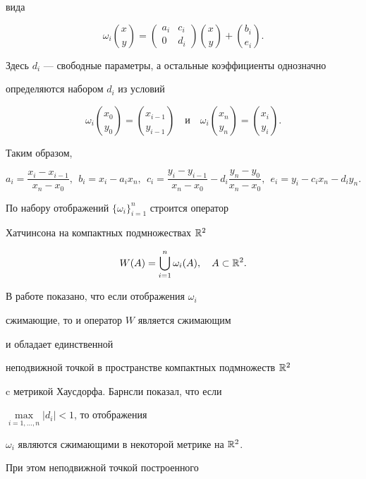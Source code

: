 вида


$$


\omega_i\binom{x}{y} = \begin{pmatrix} a_i & c_i \\ 0 & d_i \end{pmatrix}


\binom{x}{y} + \binom{b_i}{e_i}.


$$


Здесь $d_i$ --- свободные параметры, а остальные коэффициенты однозначно


определяются набором $d_i$ из условий


$$\omega_i\binom{x_{0}}{y_{0}} = \binom{x_{i-1}}{y_{i-1}}


\quad \text{и} \quad


\omega_i\binom{x_{n}}{y_{n}}= \binom{x_{i}}{y_{i}}.


$$


Таким образом,


$$


a_i=\frac{x_i-x_{i-1}}{x_n-x_0},\ \


b_i=x_i-a_ix_n ,\ \


c_i=\frac{y_i-y_{i-1}}{x_n-x_0}-d_i \frac{y_n-y_0}{x_n-x_0},\ \


e_i=y_i-c_ix_n-d_iy_n.


$$





По набору отображений $\{\omega_i\}_{i=1}^n$ строится оператор


Хатчинсона \cite{hutchinson} на компактных подмножествах ${\Bbb R}^2$


$$


W(A)=\bigcup^{n}_{i=1}\omega_i(A) , \quad A\subset {\R}^2.


$$


В работе \cite{hutchinson} показано, что если отображения $\omega_i$


сжимающие, то и оператор $W$ является сжимающим


и обладает единственной


неподвижной точкой в пространстве компактных подмножеств ${{\Bbb R}}^2$


c метрикой Хаусдорфа. Барнсли показал, что если


$\max\limits_{i=1,\dotsc,n}|d_i|<1$, то отображения


$\omega_i$ являются сжимающими в некоторой метрике на ${\Bbb R}^2$.


При этом неподвижной точкой построенного


